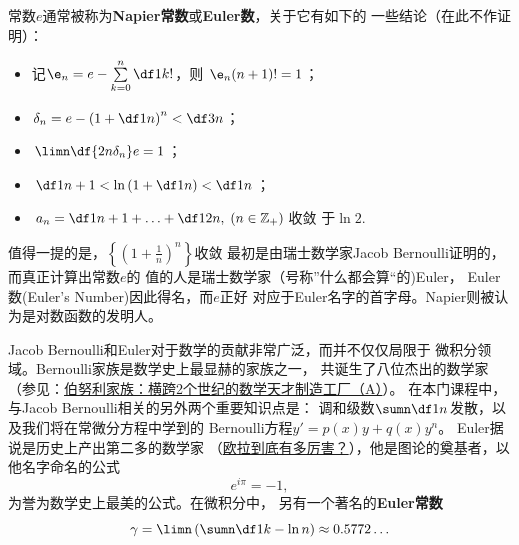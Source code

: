 \begin{shaded}
	常数$e$通常被称为{\bf Napier常数}或{\bf Euler数}，关于它有如下的
	一些结论（在此不作证明）：	
	\begin{itemize}
		\item 记$\e_n=e-\sum\limits_{k=0}^n\df1{k!}$，则
		\limn $\e_n(n+1)!=1$；
		\item $\delta_n=e-\left(1+\df1n\right)^n<\df3n$；
		\item $\limn\df{2n\delta_n}e=1$；
		\item $\df1{n+1}<\ln\left(1+\df1n\right)<\df1n$；
		\item $a_n=\df1{n+1}+\ldots+\df1{2n},\;(n\in\mathbb{Z}_+)$收敛
		于$\ln2$.
	\end{itemize}
	
	值得一提的是，$\left\{\left(1+\frac1n\right)^n\right\}$收敛
	最初是由瑞士数学家Jacob Bernoulli证明的，而真正计算出常数$e$的
	值的人是瑞士数学家（号称{\kaishu ”什么都会算“}的)Euler，
	{\kaishu Euler数}(Euler's Number)因此得名，而$e$正好
	对应于Euler名字的首字母。Napier则被认为是对数函数的发明人。

	Jacob Bernoulli和Euler对于数学的贡献非常广泛，而并不仅仅局限于
	微积分领域。Bernoulli家族是数学史上最显赫的家族之一，
	共诞生了八位杰出的数学家
	（参见：\href{https://zhuanlan.zhihu.com/p/41098703}
	{伯努利家族：横跨2个世纪的数学天才制造工厂（A）}）。
	在本门课程中，与Jacob Bernoulli相关的另外两个重要知识点是：
	调和级数$\sumn\df1n$发散，以及我们将在常微分方程中学到的
	Bernoulli方程$y'=p(x)y+q(x)y^n$。
	Euler据说是历史上产出第二多的数学家
	（\href{https://www.zhihu.com/question/41157845/answer/514221831}
	{欧拉到底有多厉害？}），他是图论的奠基者，以他名字命名的公式
	$$e^{i\pi}=-1,$$
	为誉为数学史上最美的公式。在微积分中，
	另有一个著名的{\bf Euler常数}
	$$\gamma=\limn\left(\sumn\df1k-\ln n\right)\approx 0.5772\ldots$$
\end{shaded}


